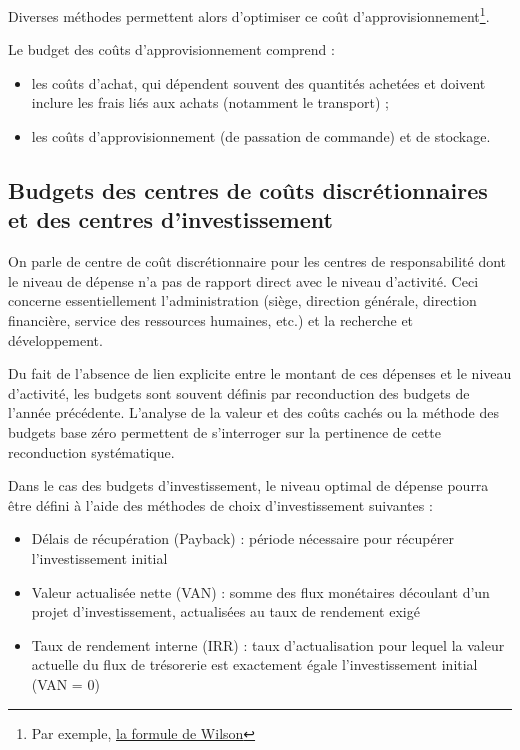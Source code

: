 \documentclass[oneside]{kaobook}
\begin{document}
Diverses méthodes permettent alors d'optimiser ce coût d'approvisionnement\footnote{Par exemple, \href{https://fr.wikipedia.org/wiki/Formule\_de\_Wilson}{la formule de Wilson}}.

Le budget des coûts d'approvisionnement comprend :
\begin{itemize}
\item les coûts d'achat, qui dépendent souvent des quantités achetées et doivent inclure les frais liés aux achats (notamment le transport) ;
\item les coûts d'approvisionnement (de passation de commande) et de stockage.
\end{itemize}

\subsection{Budgets des centres de coûts discrétionnaires et des centres d'investissement}
\label{sec:org78988cd}

On parle de centre de coût discrétionnaire pour les centres de responsabilité dont le niveau de dépense n'a pas de rapport direct avec le niveau d'activité. Ceci concerne essentiellement l'administration (siège, direction générale, direction financière, service des ressources humaines, etc.) et la recherche et développement.

Du fait de l'absence de lien explicite entre le montant de ces dépenses et le niveau d'activité, les budgets sont souvent définis par reconduction des budgets de l'année précédente. L'analyse de la valeur et des coûts cachés ou la méthode des budgets base zéro permettent de s'interroger sur la pertinence de cette reconduction systématique.

Dans le cas des budgets d'investissement, le niveau optimal de dépense pourra être défini à l'aide des méthodes de choix d'investissement suivantes :
\begin{itemize}
\item Délais de récupération (Payback) : période nécessaire pour récupérer l'investissement initial
\item Valeur actualisée nette (VAN) : somme des flux monétaires découlant d’un projet d’investissement, actualisées au taux de rendement exigé
\item Taux de rendement interne (IRR) : taux d’actualisation  pour lequel la valeur actuelle du flux de trésorerie est exactement égale l'investissement initial  (VAN  = 0)
\end{itemize}
\end{document}
